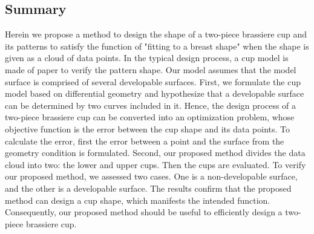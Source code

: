 \documentclass[E]{scitrans}
\begin{document}
\subsection*{Summary}
Herein we propose a method to design the shape of a two-piece brassiere cup and its patterns to satisfy the function of "fitting to a breast shape" when the shape is given as a cloud of data points. In the typical design process, a cup model is made of paper to verify the pattern shape. Our model assumes that the model surface is comprised of several developable surfaces. First, we formulate the cup model based on differential geometry and hypothesize that a developable surface can be determined by two curves included in it. Hence, the design process of a two-piece brassiere cup can be converted into an optimization problem, whose objective function is the error between the cup shape and its data points. To calculate the error, first the error between a point and the surface from the geometry condition is formulated. Second, our proposed method divides the data cloud into two: the lower and upper cups. Then the cups are evaluated. To verify our proposed method, we assessed two cases. One is a non-developable surface, and the other is a developable surface. The results confirm that the proposed method can design a cup shape, which manifests the intended function. Consequently, our proposed method should be useful to efficiently design a two-piece brassiere cup. 
\end{document}
